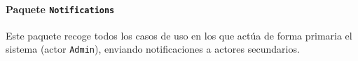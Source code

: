 \paragraph{Paquete \texttt{Notifications}}

Este paquete recoge todos los casos de uso en los que actúa de forma primaria el sistema (actor \texttt{Admin}), enviando notificaciones a actores secundarios.

